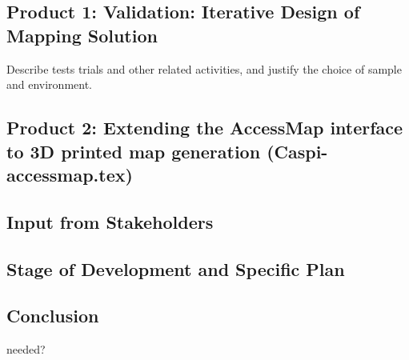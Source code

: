 \subsection{Product 1: Validation: Iterative Design of Mapping Solution}
\label{sec:mapping-validation}
Describe tests trials and other related activities, and justify the choice of sample and environment. 



\subsection{Product 2: Extending the AccessMap interface to 3D printed
map generation (Caspi-accessmap.tex)}
\label{sec:accessmap-extension}


\subsection{Input from Stakeholders}
\label{sec:stakeholder-input}


\subsection{Stage of Development and Specific Plan}
    


\subsection{Conclusion}
needed?
